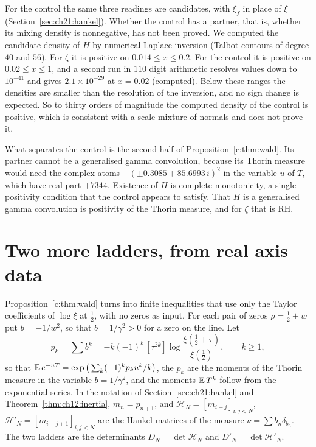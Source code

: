 For the control the same three readings are candidates, with $\xi_f$ in place of $\xi$ (Section~\ref{sec:ch21:hankel}). Whether the control has a partner, that is, whether its mixing density is nonnegative, has not been proved. We computed the candidate density of $H$ by numerical Laplace inversion (Talbot contours \cite{Talbot79} of degree $40$ and $56$). For $\zeta$ it is positive on $0.014\le x\le0.2$. For the control it is positive on $0.02\le x\le1$, and a second run in $110$ digit arithmetic resolves values down to $10^{-41}$ and gives $2.1\times10^{-29}$ at $x=0.02$ (computed). Below these ranges the densities are smaller than the resolution of the inversion, and no sign change is expected. So to thirty orders of magnitude the computed density of the control is positive, which is consistent with a scale mixture of normals and does not prove it.

What separates the control is the second half of Proposition~\ref{c:thm:wald}. Its partner cannot be a generalised gamma convolution, because its Thorin measure would need the complex atoms $-(\pm0.3085+85.6993\,i)^2$ in the variable $u$ of $T$, which have real part $+7344$. Existence of $H$ is complete monotonicity, a single positivity condition that the control appears to satisfy. That $H$ is a generalised gamma convolution is positivity of the Thorin measure, and for $\zeta$ that is RH.

\section{Two more ladders, from real axis data}\label{c:sec:grommer}

Proposition~\ref{c:thm:wald} turns into finite inequalities that use only the Taylor coefficients of $\log\xi$ at $\frac12$, with no zeros as input. For each pair of zeros $\rho=\frac12\pm w$ put $b=-1/w^2$, so that $b=1/\gamma^2>0$ for a zero on the line. Let
\[
p_k=\sum b^k=-k(-1)^k\,[\tau^{2k}]\log\frac{\xi(\frac12+\tau)}{\xi(\frac12)},\qquad k\ge1,
\]
so that $\mathbb{E}\,e^{-uT}=\exp\big(\sum_k(-1)^kp_ku^k/k\big)$, the $p_k$ are the moments of the Thorin measure in the variable $b=1/\gamma^2$, and the moments $\mathbb{E}\,T^k$ follow from the exponential series. In the notation of Section~\ref{sec:ch21:hankel} and Theorem~\ref{thm:ch12:inertia}, $m_n=p_{n+1}$, and $\mathcal H_N=[m_{i+j}]_{i,j<N}$, $\mathcal H'_N=[m_{i+j+1}]_{i,j<N}$ are the Hankel matrices of the measure $\nu=\sum b_n\delta_{b_n}$. The two ladders are the determinants $D_N=\det\mathcal H_N$ and $D'_N=\det\mathcal H'_N$.

